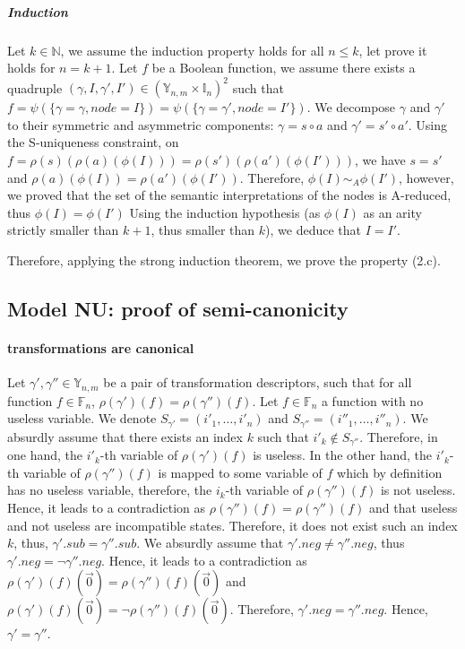 \documentclass[a4paper,10pt]{article}
\newcommand{\N}{\mathbb{N}}%
\newcommand{\F}{\mathbb{F}}
\newcommand{\Y}{\mathbb{Y}}
\newcommand{\I}{\mathbb{I}}
\begin{document}
\subparagraph{Induction}
Let $k\in\N$, we assume the induction property holds for all $n\leq k$, let prove it holds for $n = k+1$.
Let $f$ be a Boolean function, we assume there exists a quadruple $(\gamma, I, \gamma', I') \in (\Y_{n, m} \times \I_n)^2$ such that $f = \psi(\{\gamma = \gamma, node = I\}) = \psi(\{\gamma = \gamma', node = I'\})$.
We decompose $\gamma$ and $\gamma'$ to their symmetric and asymmetric components: $\gamma = s \circ a$ and $\gamma' = s' \circ a'$.
Using the S-uniqueness constraint, on $f = \rho(s)(\rho(a)(\phi(I))) = \rho(s')(\rho(a')(\phi(I')))$, we have $s = s'$ and $\rho(a)(\phi(I)) = \rho(a')(\phi(I'))$.
Therefore, $\phi(I) \sim_A \phi(I')$, however, we proved that the set of the semantic interpretations of the nodes is A-reduced, thus $\phi(I) = \phi(I')$
Using the induction hypothesis (as $\phi(I)$ as an arity strictly smaller than $k+1$, thus smaller than $k$), we deduce that $I = I'$.

Therefore, applying the strong induction theorem, we prove the property (2.c).

\subsection{Model NU: proof of semi-canonicity\label{grobdd-model-nu}}

\paragraph{transformations are canonical\\}
Let $\gamma', \gamma''\in\Y_{n, m}$ be a pair of transformation descriptors, such that for all function $f\in\F_n$, $\rho(\gamma')(f) = \rho(\gamma'')(f)$.
Let $f\in\F_n$ a function with no useless variable.
We denote $S_{\gamma'} = (i'_1, \dots, i'_n)$ and $S_{\gamma''} = (i''_1, \dots, i''_n)$.
We absurdly assume that there exists an index $k$ such that $i'_k \not\in S_{\gamma''}$.
Therefore, in one hand, the $i'_k$-th variable of $\rho(\gamma')(f)$ is useless.
In the other hand, the $i'_k$-th variable of $\rho(\gamma'')(f)$ is mapped to some variable of $f$ which by definition has no useless variable, therefore, the $i_k$-th variable of $\rho(\gamma'')(f)$ is not useless.
Hence, it leads to a contradiction as $\rho(\gamma'')(f) = \rho(\gamma'')(f)$ and that useless and not useless are incompatible states.
Therefore, it does not exist such an index $k$, thus, $\gamma'.sub = \gamma''.sub$.
We absurdly assume that $\gamma'.neg \neq \gamma''.neg$, thus $\gamma'.neg = \lnot \gamma''.neg$.
Hence, it leads to a contradiction as $\rho(\gamma')(f)(\vec{0}) = \rho(\gamma'')(f)(\vec{0})$ and $\rho(\gamma')(f)(\vec{0}) = \lnot \rho(\gamma'')(f)(\vec{0})$.
Therefore, $\gamma'.neg = \gamma''.neg$.
Hence, $\gamma' = \gamma''$.
\end{document}

